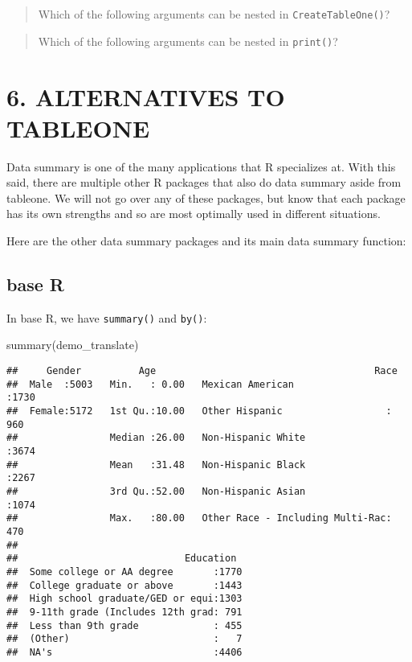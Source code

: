 \documentclass[
]{book}
\newenvironment{Shaded}{\begin{snugshade}}{\end{snugshade}}
\newcommand{\FunctionTok}[1]{\textcolor[rgb]{0.00,0.00,0.00}{#1}}
\newcommand{\NormalTok}[1]{#1}
\begin{document}
\begin{quote}
Which of the following arguments can be nested in \texttt{CreateTableOne()}?
\end{quote}

\begin{quote}
Which of the following arguments can be nested in \texttt{print()}?
\end{quote}

\hypertarget{alternatives-to-tableone}{%
\section{6. ALTERNATIVES TO TABLEONE}\label{alternatives-to-tableone}}

Data summary is one of the many applications that R specializes at. With this said, there are multiple other R packages that also do data summary aside from tableone. We will not go over any of these packages, but know that each package has its own strengths and so are most optimally used in different situations.

Here are the other data summary packages and its main data summary function:

\hypertarget{base-r}{%
\subsection{base R}\label{base-r}}

In base R, we have \texttt{summary()} and \texttt{by()}:

\begin{Shaded}
\begin{Highlighting}[]
\FunctionTok{summary}\NormalTok{(demo\_translate)}
\end{Highlighting}
\end{Shaded}

\begin{verbatim}
##     Gender          Age                                      Race
##  Male  :5003   Min.   : 0.00   Mexican American                :1730
##  Female:5172   1st Qu.:10.00   Other Hispanic                  : 960
##                Median :26.00   Non-Hispanic White              :3674
##                Mean   :31.48   Non-Hispanic Black              :2267
##                3rd Qu.:52.00   Non-Hispanic Asian              :1074
##                Max.   :80.00   Other Race - Including Multi-Rac: 470
##
##                             Education
##  Some college or AA degree       :1770
##  College graduate or above       :1443
##  High school graduate/GED or equi:1303
##  9-11th grade (Includes 12th grad: 791
##  Less than 9th grade             : 455
##  (Other)                         :   7
##  NA's                            :4406
\end{verbatim}
\end{document}
